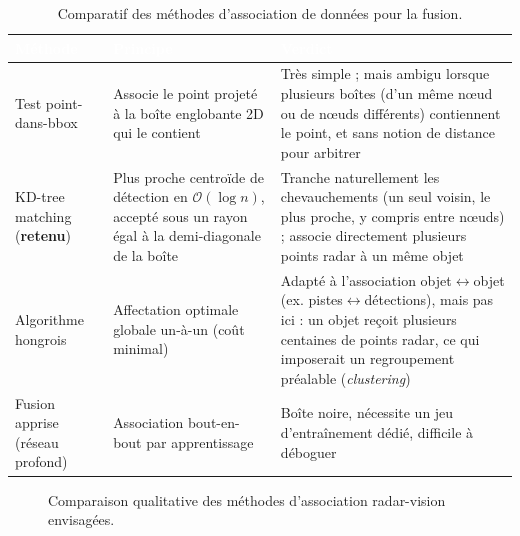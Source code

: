 \documentclass[12pt,a4paper,titlepage]{article}
\newcommand{\hd}[1]{\textcolor{white}{\textbf{#1}}}
\newcommand{\choix}{\rowcolor{tabchoice}}
\begin{document}
\begin{table}[H]
    \centering
    \caption{Comparatif des méthodes d'association de données pour la fusion.}
    \begin{tabularx}{\textwidth}{F{3.4cm}LL}
        \toprule
        \hd{Méthode} & \hd{Principe} & \hd{Verdict} \\
        \midrule
        Test point-dans-bbox & Associe le point projeté à la boîte englobante 2D qui le contient & Très simple ; mais ambigu lorsque plusieurs boîtes (d'un même n\oe ud ou de n\oe uds différents) contiennent le point, et sans notion de distance pour arbitrer \\
        \choix KD-tree matching (\textbf{retenu}) & Plus proche centroïde de détection en $\mathcal{O}(\log n)$, accepté sous un rayon égal à la demi-diagonale de la boîte & Tranche naturellement les chevauchements (un seul voisin, le plus proche, y compris entre n\oe uds) ; associe directement plusieurs points radar à un même objet \\
        Algorithme hongrois & Affectation optimale globale un-à-un (coût minimal) & Adapté à l'association objet$\leftrightarrow$objet (ex. pistes$\leftrightarrow$détections), mais pas ici : un objet reçoit plusieurs centaines de points radar, ce qui imposerait un regroupement préalable (\textit{clustering}) \\
        Fusion apprise (réseau profond) & Association bout-en-bout par apprentissage & Boîte noire, nécessite un jeu d'entraînement dédié, difficile à déboguer \\
        \bottomrule
    \end{tabularx}
\end{table}

\begin{figure}[H]
    \centering
    \caption{Comparaison qualitative des méthodes d'association radar-vision envisagées.}
    \label{fig:chart_fusion}
\end{figure}
\end{document}
